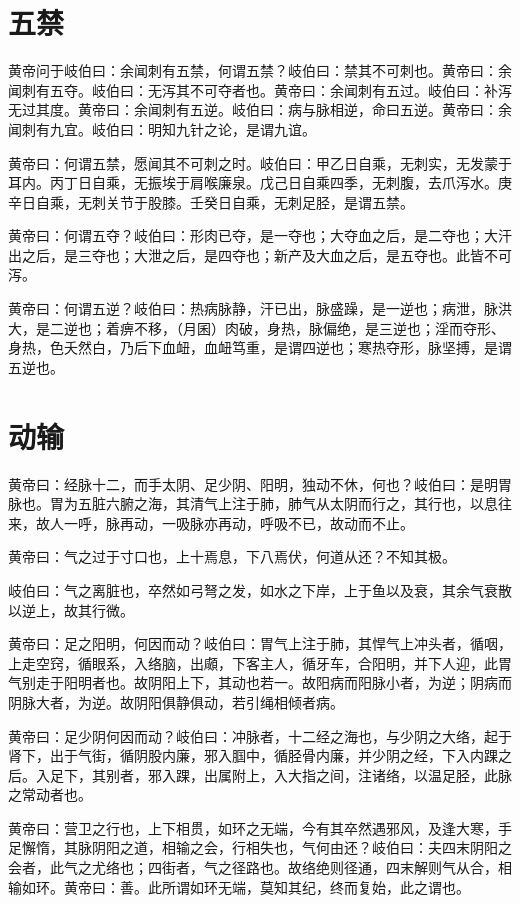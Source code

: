 \documentclass[12pt,UTF8]{ctexbook}
\begin{document}
	\chapter{五禁}
	
	黄帝问于岐伯曰：余闻刺有五禁，何谓五禁？岐伯曰：禁其不可刺也。黄帝曰：余闻刺有五夺。岐伯曰：无泻其不可夺者也。黄帝曰：余闻刺有五过。岐伯曰：补泻无过其度。黄帝曰：余闻刺有五逆。岐伯曰：病与脉相逆，命曰五逆。黄帝曰：余闻刺有九宜。岐伯曰：明知九针之论，是谓九谊。
	
	黄帝曰：何谓五禁，愿闻其不可刺之时。岐伯曰：甲乙日自乘，无刺实，无发蒙于耳内。丙丁日自乘，无振埃于肩喉廉泉。戊己日自乘四季，无刺腹，去爪泻水。庚辛日自乘，无刺关节于股膝。壬癸日自乘，无刺足胫，是谓五禁。
	
	黄帝曰：何谓五夺？岐伯曰：形肉已夺，是一夺也；大夺血之后，是二夺也；大汗出之后，是三夺也；大泄之后，是四夺也；新产及大血之后，是五夺也。此皆不可泻。
	
	黄帝曰：何谓五逆？岐伯曰：热病脉静，汗已出，脉盛躁，是一逆也；病泄，脉洪大，是二逆也；着痹不移，（月囷）肉破，身热，脉偏绝，是三逆也；淫而夺形、身热，色夭然白，乃后下血衄，血衄笃重，是谓四逆也；寒热夺形，脉坚搏，是谓五逆也。
	\chapter{动输}
	
	黄帝曰：经脉十二，而手太阴、足少阴、阳明，独动不休，何也？岐伯曰：是明胃脉也。胃为五脏六腑之海，其清气上注于肺，肺气从太阴而行之，其行也，以息往来，故人一呼，脉再动，一吸脉亦再动，呼吸不已，故动而不止。
	
	黄帝曰：气之过于寸口也，上十焉息，下八焉伏，何道从还？不知其极。
	
	岐伯曰：气之离脏也，卒然如弓弩之发，如水之下岸，上于鱼以及衰，其余气衰散以逆上，故其行微。
	
	黄帝曰：足之阳明，何因而动？岐伯曰：胃气上注于肺，其悍气上冲头者，循咽，上走空窍，循眼系，入络脑，出顑，下客主人，循牙车，合阳明，并下人迎，此胃气别走于阳明者也。故阴阳上下，其动也若一。故阳病而阳脉小者，为逆；阴病而阴脉大者，为逆。故阴阳俱静俱动，若引绳相倾者病。
	
	黄帝曰：足少阴何因而动？岐伯曰：冲脉者，十二经之海也，与少阴之大络，起于肾下，出于气街，循阴股内廉，邪入腘中，循胫骨内廉，并少阴之经，下入内踝之后。入足下，其别者，邪入踝，出属附上，入大指之间，注诸络，以温足胫，此脉之常动者也。
	
	黄帝曰：营卫之行也，上下相贯，如环之无端，今有其卒然遇邪风，及逢大寒，手足懈惰，其脉阴阳之道，相输之会，行相失也，气何由还？岐伯曰：夫四末阴阳之会者，此气之尤络也；四街者，气之径路也。故络绝则径通，四末解则气从合，相输如环。黄帝曰：善。此所谓如环无端，莫知其纪，终而复始，此之谓也。
	
\end{document}
